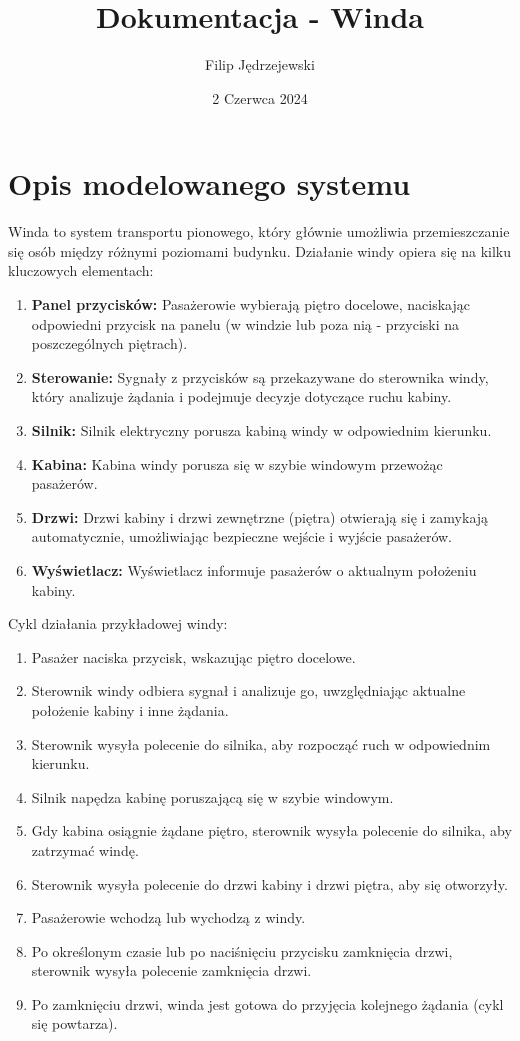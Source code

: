 \documentclass{article}
\title{Dokumentacja - Winda}
\author{Filip Jędrzejewski}
\date{2 Czerwca 2024}
\begin{document}
\maketitle

\section{Opis modelowanego systemu}

Winda to system transportu pionowego, który głównie umożliwia przemieszczanie się osób między różnymi poziomami budynku. Działanie windy opiera się na kilku kluczowych elementach:

\begin{enumerate}
    \item \textbf{Panel przycisków:} Pasażerowie wybierają piętro docelowe, naciskając odpowiedni przycisk na panelu (w windzie lub poza nią - przyciski na poszczególnych piętrach).
    \item \textbf{Sterowanie:} Sygnały z przycisków są przekazywane do sterownika windy, który analizuje żądania i podejmuje decyzje dotyczące ruchu kabiny.
    \item \textbf{Silnik:} Silnik elektryczny porusza kabiną windy w odpowiednim kierunku.
    \item \textbf{Kabina:} Kabina windy porusza się w szybie windowym przewożąc pasażerów.
    \item \textbf{Drzwi:} Drzwi kabiny i drzwi zewnętrzne (piętra) otwierają się i zamykają automatycznie, umożliwiając bezpieczne wejście i wyjście pasażerów.
    \item \textbf{Wyświetlacz:} Wyświetlacz informuje pasażerów o aktualnym położeniu kabiny.
\end{enumerate}

Cykl działania przykładowej windy:

\begin{enumerate}
    \item Pasażer naciska przycisk, wskazując piętro docelowe.
    \item Sterownik windy odbiera sygnał i analizuje go, uwzględniając aktualne położenie kabiny i inne żądania.
    \item Sterownik wysyła polecenie do silnika, aby rozpocząć ruch w odpowiednim kierunku.
    \item Silnik napędza kabinę poruszającą się w szybie windowym.
    \item Gdy kabina osiągnie żądane piętro, sterownik wysyła polecenie do silnika, aby zatrzymać windę.
    \item Sterownik wysyła polecenie do drzwi kabiny i drzwi piętra, aby się otworzyły.
    \item Pasażerowie wchodzą lub wychodzą z windy.
    \item Po określonym czasie lub po naciśnięciu przycisku zamknięcia drzwi, sterownik wysyła polecenie zamknięcia drzwi.
    \item Po zamknięciu drzwi, winda jest gotowa do przyjęcia kolejnego żądania (cykl się powtarza).
\end{enumerate}
\end{document}
